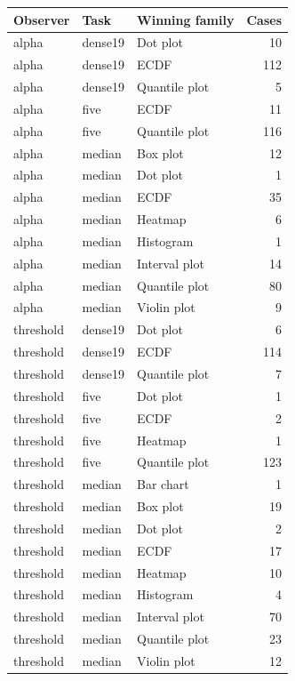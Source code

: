 \begin{longtable}{lllr}\toprule
Observer & Task & Winning family & Cases\\\midrule\endhead
alpha & dense19 & Dot plot & 10\\
alpha & dense19 & ECDF & 112\\
alpha & dense19 & Quantile plot & 5\\
alpha & five & ECDF & 11\\
alpha & five & Quantile plot & 116\\
alpha & median & Box plot & 12\\
alpha & median & Dot plot & 1\\
alpha & median & ECDF & 35\\
alpha & median & Heatmap & 6\\
alpha & median & Histogram & 1\\
alpha & median & Interval plot & 14\\
alpha & median & Quantile plot & 80\\
alpha & median & Violin plot & 9\\
threshold & dense19 & Dot plot & 6\\
threshold & dense19 & ECDF & 114\\
threshold & dense19 & Quantile plot & 7\\
threshold & five & Dot plot & 1\\
threshold & five & ECDF & 2\\
threshold & five & Heatmap & 1\\
threshold & five & Quantile plot & 123\\
threshold & median & Bar chart & 1\\
threshold & median & Box plot & 19\\
threshold & median & Dot plot & 2\\
threshold & median & ECDF & 17\\
threshold & median & Heatmap & 10\\
threshold & median & Histogram & 4\\
threshold & median & Interval plot & 70\\
threshold & median & Quantile plot & 23\\
threshold & median & Violin plot & 12\\
\bottomrule\end{longtable}
